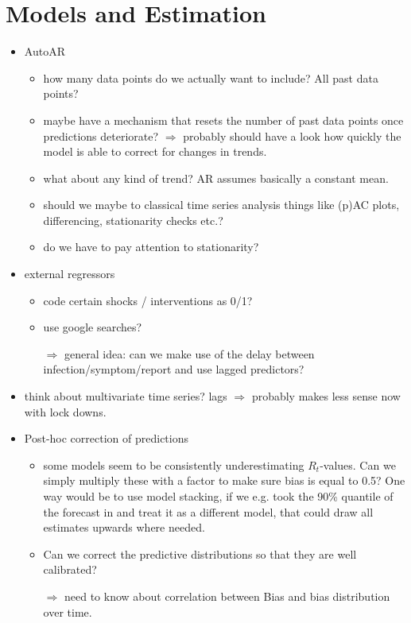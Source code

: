 \chapter{Models and Estimation}
\begin{itemize}
\item AutoAR
	\begin{itemize}
	\item how many data points do we actually want to include? All past data points? 
	\item maybe have a mechanism that resets the number of past data points once predictions deteriorate? 
	$\Rightarrow$ probably should have a look how quickly the model is able to correct for changes in trends. 
	\item what about any kind of trend? AR assumes basically a constant mean. 
	\item should we maybe to classical time series analysis things like (p)AC plots, differencing, stationarity checks etc.? 
	\item do we have to pay attention to stationarity? 
	\end{itemize}
\item external regressors
	\begin{itemize}
	\item code certain shocks / interventions as 0/1?
	\item use google searches? 

	$\Rightarrow$ general idea: can we make use of the delay between infection/symptom/report and use lagged predictors? 
	\end{itemize}
\item think about multivariate time series? lags $\Rightarrow$ probably makes less sense now with lock downs. 

\item Post-hoc correction of predictions
	\begin{itemize}
	\item some models seem to be consistently underestimating $R_t$-values. Can we simply multiply these with a factor to make sure bias is equal to 0.5? 
	One way would be to use model stacking, if we e.g. took the 90\% quantile of the forecast in and treat it as a different model, that could draw all estimates upwards where needed. 
	\item Can we correct the predictive distributions so that they are well calibrated? 

	$\Rightarrow$ need to know about correlation between Bias and bias distribution over time. 
	\end{itemize}


\end{itemize}
